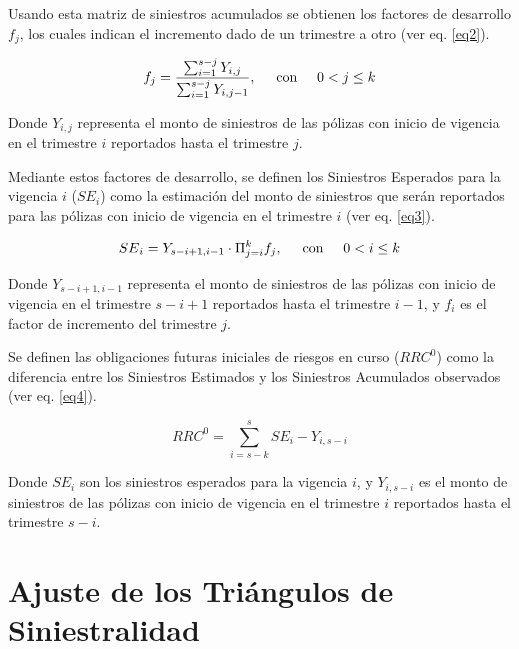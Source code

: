 \documentclass[11pt,twoside,openright,spanish]{report}
\numberwithin{equation}{chapter}
\numberwithin{figure}{chapter}
\numberwithin{table}{chapter}
\begin{document}
	
	Usando esta matriz de siniestros acumulados se obtienen los factores de desarrollo ${f}_{j}$, los cuales indican el incremento dado de un trimestre a otro (ver eq. \ref{eq2}).

	\begin{equation}
	{f}_{j}=\frac{\sum _{i=1}^{s-j}{Y}_{i,j}}{\sum _{i=1}^{s-j}{Y}_{i,j-1}}, \hspace{0.5cm}\text{con}\hspace{0.5cm} 0< j\le k
	\label{eq2}
	\end{equation}

	Donde ${Y}_{i,j}$ representa el monto de siniestros de las pólizas con inicio de vigencia en el trimestre $i$ reportados hasta el trimestre $j$.

	Mediante estos factores de desarrollo, se definen los Siniestros Esperados para la vigencia $i$ (${SE}_{i}$) como la estimación del monto de siniestros que serán reportados para las pólizas con inicio de vigencia en el trimestre $i$ (ver eq. \ref{eq3}).
	
	\begin{equation}
	{SE}_{i}={Y}_{s-i+1,i-1}\cdot\Pi_{j=i}^{k}{f}_{j},\hspace{0.5cm}\text{con}\hspace{0.5cm}0< i\le k
		\label{eq3}
	\end{equation}

	Donde ${Y}_{s-i+1,i-1}$ representa el monto de siniestros de las pólizas con inicio de vigencia en el trimestre $s-i+1$ reportados hasta el trimestre $i-1$, y ${f}_{i}$ es el factor de incremento del trimestre $j$. 

	Se definen las obligaciones futuras iniciales de riesgos en curso (${RRC}^{0}$) como la diferencia entre los Siniestros Estimados y los Siniestros Acumulados observados (ver eq. \ref{eq4}).
	
	\begin{equation}
	{RRC}^{0}=\sum _{i=s-k}^{s}{SE}_{i}-{Y}_{i,s-i}
	\label{eq4}
	\end{equation}

	Donde ${SE}_{i}$ son los siniestros esperados para la vigencia $i$, y ${Y}_{i,s-i}$ es el monto de siniestros de las pólizas con inicio de vigencia en el trimestre $i$ reportados hasta el trimestre $s-i$.
		 
\section{Ajuste de los Triángulos de Siniestralidad}		 
		 
\end{document}
